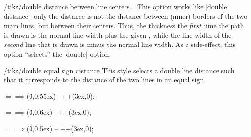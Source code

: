 \begin{key}{/tikz/double distance between line centers=}
    This option works like |double distance|, only the distance is not the
    distance between (inner) borders of the two main lines, but between their
    centers. Thus, the thickness the \emph{first} time the path is drawn is the
    normal line width plus the given , while the line width of
    the \emph{second} line that is drawn is  minus the normal
    line width. As a side-effect, this option ``selects'' the |double| option.
\begin{codeexample}[]
\end{codeexample}
\begin{codeexample}[]
\end{codeexample}
\end{key}

\begin{stylekey}{/tikz/double equal sign distance}
    This style selects a double line distance such that it corresponds to the
    distance of the two lines in an equal sign.
\begin{codeexample}[
    preamble={\usepackage{amsmath}
\usetikzlibrary{arrows.meta}}
]
\Huge $=\implies$
                    (0,0.55ex) --++(3ex,0);
\end{codeexample}
\begin{codeexample}[
    preamble={\usepackage{amsmath}
\usetikzlibrary{arrows.meta}}
]
\normalsize $=\implies$
                          (0,0.6ex) --++(3ex,0);
\end{codeexample}
\begin{codeexample}[
    preamble={\usepackage{amsmath}
\usetikzlibrary{arrows.meta}}
]
\tiny $=\implies$
                   (0,0.5ex) -- ++(3ex,0);
\end{codeexample}
\end{stylekey}


